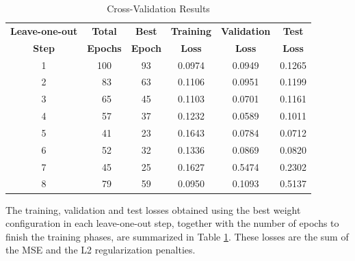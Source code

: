 \documentclass[conference]{IEEEtran}
\begin{document}
\begin{table}[htbp]
\begin{center}
\caption{Cross-Validation Results}
\begin{tabular}{|c|c c| c c c|}
\hline
\textbf{Leave-one-out} & \textbf{Total} & \textbf{Best} & \textbf{Training} & \textbf{Validation} & \textbf{Test} \\
\textbf{Step} & \textbf{Epochs} & \textbf{Epoch} & \textbf{Loss} & \textbf{Loss} & \textbf{Loss} \\
\hline
1 &  100 & 93 & 0.0974 & 0.0949 & 0.1265 \\ %
2 & \ 83 & 63 & 0.1106 & 0.0951 & 0.1199 \\ %
3 & \ 65 & 45 & 0.1103 & 0.0701 & 0.1161 \\ %
4 & \ 57 & 37 & 0.1232 & 0.0589 & 0.1011 \\ %
5 & \ 41 & 23 & 0.1643 & 0.0784 & 0.0712 \\ %
6 & \ 52 & 32 & 0.1336 & 0.0869 & 0.0820 \\ %
7 & \ 45 & 25 & 0.1627 & 0.5474 & 0.2302 \\ %
8 & \ 79 & 59 & 0.0950 & 0.1093 & 0.5137 \\ \hline
\end{tabular}
\label{tab:results}
\end{center}
\end{table}

The training, validation and test losses obtained using the best weight configuration in each leave-one-out step, together with the number of epochs to finish the training phases, are summarized in Table \ref{tab:results}.
These losses are the sum of the MSE and the L2 regularization penalties.
\end{document}
